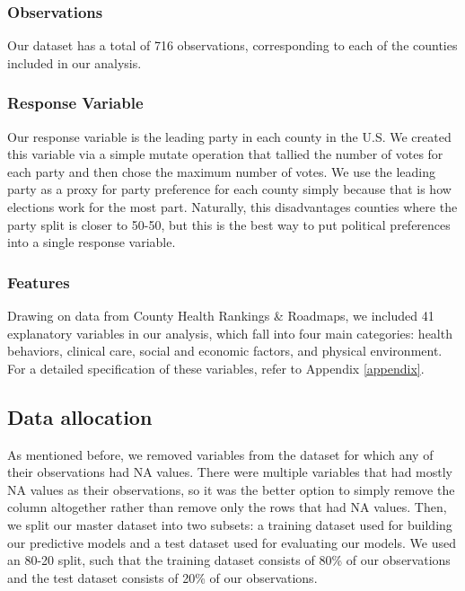 \documentclass[
]{article}
\begin{document}
\hypertarget{observations}{%
\subsubsection{Observations}\label{observations}}

Our dataset has a total of 716 observations, corresponding to each of the counties included in our analysis.

\hypertarget{response-variable}{%
\subsubsection{Response Variable}\label{response-variable}}

Our response variable is the leading party in each county in the U.S. We created this variable via a simple mutate operation that tallied the number of votes for each party and then chose the maximum number of votes. We use the leading party as a proxy for party preference for each county simply because that is how elections work for the most part. Naturally, this disadvantages counties where the party split is closer to 50-50, but this is the best way to put political preferences into a single response variable.

\hypertarget{features}{%
\subsubsection{Features}\label{features}}

Drawing on data from County Health Rankings \& Roadmaps, we included 41 explanatory variables in our analysis, which fall into four main categories: health behaviors, clinical care, social and economic factors, and physical environment. For a detailed specification of these variables, refer to Appendix \ref{appendix}.

\hypertarget{data-allocation}{%
\subsection{Data allocation}\label{data-allocation}}

As mentioned before, we removed variables from the dataset for which any of their observations had NA values. There were multiple variables that had mostly NA values as their observations, so it was the better option to simply remove the column altogether rather than remove only the rows that had NA values. Then, we split our master dataset into two subsets: a training dataset used for building our predictive models and a test dataset used for evaluating our models. We used an 80-20 split, such that the training dataset consists of 80\% of our observations and the test dataset consists of 20\% of our observations.
\end{document}
